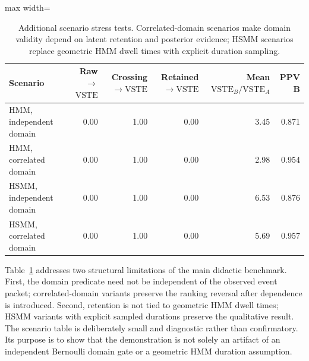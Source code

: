 \documentclass[11pt,a4paper]{article}
\newcommand{\VSTE}{\ensuremath{\mathrm{VSTE}}}
\newcommand{\1}{\mathbf{1}}
\begin{document}
\begin{table}[h]
\centering
\caption{Additional scenario stress tests. Correlated-domain scenarios make domain validity depend on latent retention and posterior evidence; HSMM scenarios replace geometric HMM dwell times with explicit duration sampling.}
\label{tab:hmm-scenarios}
\small
\begin{adjustbox}{max width=\linewidth}
\begin{tabular}{lrrrrr}
\toprule
Scenario & Raw$\to$\VSTE{} & Crossing$\to$\VSTE{} & Retained$\to$\VSTE{} & Mean $\VSTE_B/\VSTE_A$ & PPV B \\
\midrule
HMM, independent domain & 0.00 & 1.00 & 0.00 & 3.45 & 0.871 \\
HMM, correlated domain & 0.00 & 1.00 & 0.00 & 2.98 & 0.954 \\
HSMM, independent domain & 0.00 & 1.00 & 0.00 & 6.53 & 0.876 \\
HSMM, correlated domain & 0.00 & 1.00 & 0.00 & 5.69 & 0.957 \\
\bottomrule
\end{tabular}
\end{adjustbox}
\end{table}

Table~\ref{tab:hmm-scenarios} addresses two structural limitations of the main didactic benchmark. First, the domain predicate need not be independent of the observed event packet; correlated-domain variants preserve the ranking reversal after dependence is introduced. Second, retention is not tied to geometric HMM dwell times; HSMM variants with explicit sampled durations preserve the qualitative result. The scenario table is deliberately small and diagnostic rather than confirmatory. Its purpose is to show that the demonstration is not solely an artifact of an independent Bernoulli domain gate or a geometric HMM duration assumption.
\end{document}
